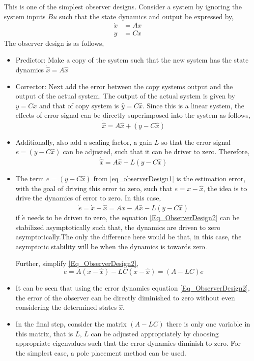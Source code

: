 This is one of the simplest observer designs. Consider a system by ignoring the system inputs $Bu$ such that the state dynamics and output be expressed by,
\begin{align}
	\dot{x} &= A x \\
	y &= C x
\end{align}
The observer design is as follows,
\begin{itemize}
	\item Predictor: Make a copy of the system such that the new system has the state dynamics $\dot{\hat{x}} = A \hat{x}$
	\item Corrector: Next add the error between the copy systems output and the output of the actual system. The output of the actual system is given by $y = C x$ and that of copy system is $\hat{y} = C \hat{x}$. Since this is a linear system, the effects of error signal can be directly superimposed into the system as follows,
	\begin{equation}
		\dot{\hat{x}} = A \hat{x} + (y - C \hat{x})
	\end{equation}
	\item Additionally, also add a scaling factor, a gain $L$ so that the error signal $e = (y - C \hat{x})$ can be adjusted, such that it can be driver to zero. Therefore,
		\begin{equation}\label{eq_observerDesign1}
	\dot{\hat{x}} = A \hat{x} + L(y - C \hat{x})
	\end{equation}
	\item The term $e = (y - C \hat{x})$ from \eqref{eq_observerDesign1} is the estimation error, with the goal of driving this error to zero, such that $e = x - \hat{x}$, the idea is to drive the dynamics of error to zero. In this case,
	\begin{equation}\label{Eq_ObserverDesign2}
		\dot{e} = \dot{x} - \dot{\hat{x}} = Ax - A \hat{x} - L(y - C \hat{x})
	\end{equation}
	if $\dot{e}$ needs to be driven to zero, the equation \eqref{Eq_ObserverDesign2} can be stabilized asymptotically such that, the dynamics are driven to zero asymptotically.The only the difference here would be that, in this case, the asymptotic stability will be when the dynamics is towards zero.
	
	Further, simplify \eqref{Eq_ObserverDesign2},
	\begin{equation} \label{Eq_ErrorDynamics}
		\dot{e} = A (x - \hat{x}) - LC (x - \hat{x}) = (A - LC) e
	\end{equation}
	\item It can be seen that using the error dynamics equation \eqref{Eq_ObserverDesign2}, the error of the observer can be directly diminished to zero without even considering the determined states $\hat{x}$.
	\item In the final step, consider the matrix $(A - LC)$ there is only one variable in this matrix, that is $L$, $L$ can be adjusted appropriately by choosing appropriate eigenvalues such that the error dynamics diminish to zero. For the simplest case, a pole placement method can be used.
\end{itemize}

